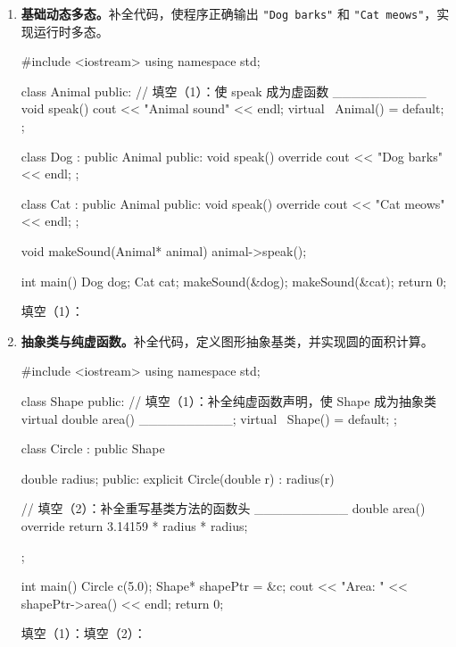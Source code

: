 \documentclass[UTF8,fontset=fandol,zihao=-4,a4paper]{ctexart}
\newcommand{\blank}[1][2.4cm]{\underline{\hspace{#1}}}
\newenvironment{questionkeep}
  {\begin{minipage}[t]{\linewidth}}
  {\end{minipage}}
\begin{document}
\begin{enumerate}
  \item
  \begin{questionkeep}
  \textbf{基础动态多态。}补全代码，使程序正确输出 \texttt{"Dog barks"} 和 \texttt{"Cat meows"}，实现运行时多态。

\begin{cppcode}
#include <iostream>
using namespace std;

class Animal {
public:
    // 填空（1）：使 speak 成为虚函数
    __________ void speak() { cout << "Animal sound" << endl; }
    virtual ~Animal() = default;
};

class Dog : public Animal {
public:
    void speak() override { cout << "Dog barks" << endl; }
};

class Cat : public Animal {
public:
    void speak() override { cout << "Cat meows" << endl; }
};

void makeSound(Animal* animal) {
    animal->speak();
}

int main() {
    Dog dog;
    Cat cat;
    makeSound(&dog);
    makeSound(&cat);
    return 0;
}
\end{cppcode}

  填空（1）：\blank[5cm]
  \end{questionkeep}

  \item
  \begin{questionkeep}
  \textbf{抽象类与纯虚函数。}补全代码，定义图形抽象基类，并实现圆的面积计算。

\begin{cppcode}
#include <iostream>
using namespace std;

class Shape {
public:
    // 填空（1）：补全纯虚函数声明，使 Shape 成为抽象类
    virtual double area() __________;
    virtual ~Shape() = default;
};

class Circle : public Shape {
    double radius;
public:
    explicit Circle(double r) : radius(r) {}

    // 填空（2）：补全重写基类方法的函数头
    __________ double area() override {
        return 3.14159 * radius * radius;
    }
};

int main() {
    Circle c(5.0);
    Shape* shapePtr = &c;
    cout << "Area: " << shapePtr->area() << endl;
    return 0;
}
\end{cppcode}

  填空（1）：\blank[4cm]\qquad 填空（2）：\blank[4cm]
  \end{questionkeep}


\end{enumerate}
\end{document}
